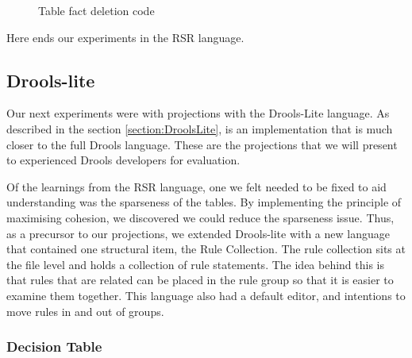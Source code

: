 \begin{figure}[h]
    \centering
    \caption{Table fact deletion code}
    \label{fig:tableFactDeletion}
\end{figure}

Here ends our experiments in the RSR language.

\subsection{Drools-lite}

Our next experiments were with projections with the Drools-Lite language.
As described in the section \ref{section:DroolsLite}, is an implementation that is much closer to the full Drools language.
These are the projections that we will present to experienced Drools developers for evaluation.

Of the learnings from the RSR language, one we felt needed to be fixed to aid understanding was the sparseness of the tables.
By implementing the principle of maximising cohesion, we discovered we could reduce the sparseness issue.
Thus, as a precursor to our projections, we extended Drools-lite with a new language that contained one structural item, the Rule Collection.
The rule collection sits at the file level and holds a collection of rule statements.
The idea behind this is that rules that are related can be placed in the rule group so that it is easier to examine them together.
This language also had a default editor, and intentions to move rules in and out of groups.

\subsubsection{Decision Table}

